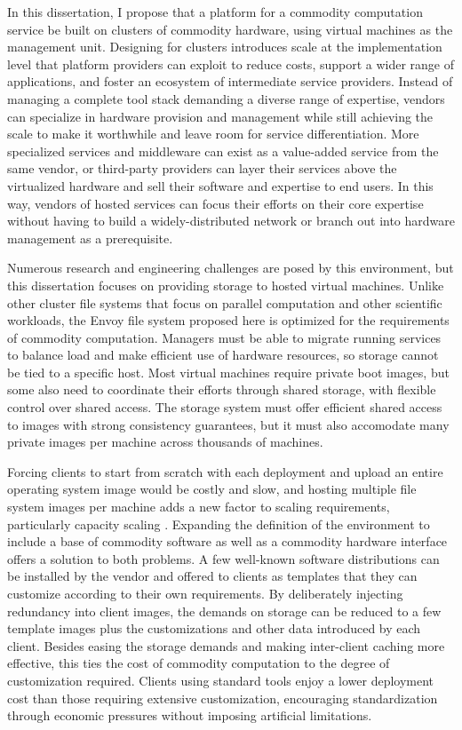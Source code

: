 In this dissertation, I propose that a platform for a commodity computation service be built on clusters of commodity hardware, using virtual machines as the management unit. Designing for clusters introduces scale at the implementation level that platform providers can exploit to reduce costs, support a wider range of applications, and foster an ecosystem of intermediate service providers. Instead of managing a complete tool stack demanding a diverse range of expertise, vendors can specialize in hardware provision and management while still achieving the scale to make it worthwhile and leave room for service differentiation. More specialized services and middleware can exist as a value-added service from the same vendor, or third-party providers can layer their services above the virtualized hardware and sell their software and expertise to end users. In this way, vendors of hosted services can focus their efforts on their core expertise without having to build a widely-distributed network or branch out into hardware management as a prerequisite.

Numerous research and engineering challenges are posed by this environment, but this dissertation focuses on providing storage to hosted virtual machines. Unlike other cluster file systems that focus on parallel computation and other scientific workloads, the Envoy file system proposed here is optimized for the requirements of commodity computation. Managers must be able to migrate running services to balance load and make efficient use of hardware resources, so storage cannot be tied to a specific host. Most virtual machines require private boot images, but some also need to coordinate their efforts through shared storage, with flexible control over shared access. The storage system must offer efficient shared access to images with strong consistency guarantees, but it must also accomodate many private images per machine across thousands of machines.

Forcing clients to start from scratch with each deployment and upload an entire operating system image would be costly and slow, and hosting multiple file system images per machine adds a new factor to scaling requirements, particularly capacity scaling \cite{warfield}. Expanding the definition of the environment to include a base of commodity software as well as a commodity hardware interface offers a solution to both problems. A few well-known software distributions can be installed by the vendor and offered to clients as templates that they can customize according to their own requirements. By deliberately injecting redundancy into client images, the demands on storage can be reduced to a few template images plus the customizations and other data introduced by each client. Besides easing the storage demands and making inter-client caching more effective, this ties the cost of commodity computation to the degree of customization required. Clients using standard tools enjoy a lower deployment cost than those requiring extensive customization, encouraging standardization through economic pressures without imposing artificial limitations.

